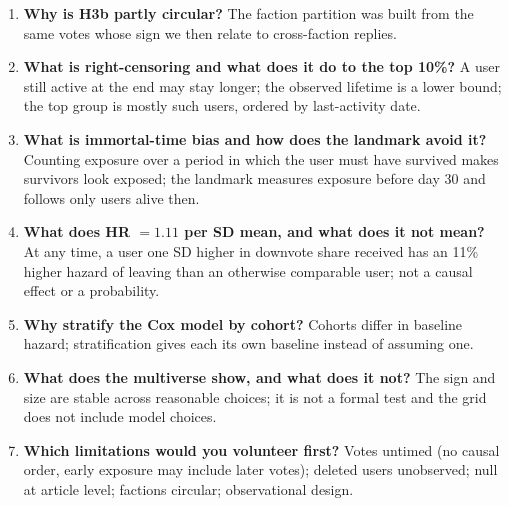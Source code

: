 \documentclass[11pt,a4paper]{article}
\begin{document}
\begin{enumerate}
\item \textbf{Why is H3b partly circular?} The faction partition was built from the same votes whose sign we then relate to cross-faction replies.
\item \textbf{What is right-censoring and what does it do to the top 10\%?} A user still active at the end may stay longer; the observed lifetime is a lower bound; the top group is mostly such users, ordered by last-activity date.
\item \textbf{What is immortal-time bias and how does the landmark avoid it?} Counting exposure over a period in which the user must have survived makes survivors look exposed; the landmark measures exposure before day 30 and follows only users alive then.
\item \textbf{What does HR $=1.11$ per SD mean, and what does it not mean?} At any time, a user one SD higher in downvote share received has an 11\% higher hazard of leaving than an otherwise comparable user; not a causal effect or a probability.
\item \textbf{Why stratify the Cox model by cohort?} Cohorts differ in baseline hazard; stratification gives each its own baseline instead of assuming one.
\item \textbf{What does the multiverse show, and what does it not?} The sign and size are stable across reasonable choices; it is not a formal test and the grid does not include model choices.
\item \textbf{Which limitations would you volunteer first?} Votes untimed (no causal order, early exposure may include later votes); deleted users unobserved; null at article level; factions circular; observational design.
\end{enumerate}

\end{document}
